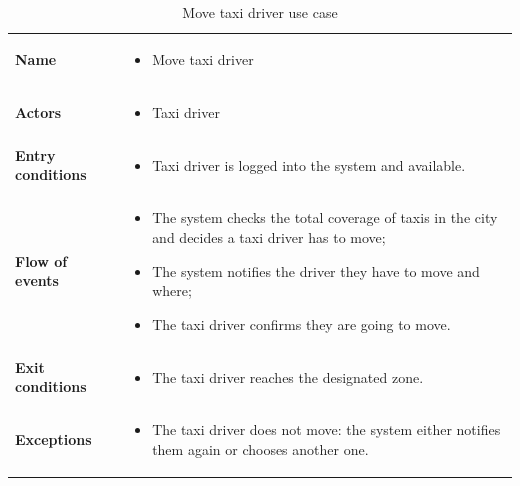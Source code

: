 \begin{table}
\begin{center}
\begin{tabular}{lp{}}
\toprule
\textbf{Name}		&	\begin{itemize}
					\item Move taxi driver
					\end{itemize}	\\
\textbf{Actors}		&	\begin{itemize}
					\item Taxi driver
					\end{itemize}	\\
\textbf{Entry conditions}	&	\begin{itemize}
					\item Taxi driver is logged into the system and available.
					\end{itemize}	\\
\textbf{Flow of events}	&	\begin{itemize}
					\item The system checks the total coverage of taxis in the city and decides a taxi driver has to move;
					\item The system notifies the driver they have to move and where;
					\item The taxi driver confirms they are going to move.
					\end{itemize}	\\
\textbf{Exit conditions}	&	\begin{itemize}
					\item	The taxi driver reaches the designated zone.
					\end{itemize}	\\
\textbf{Exceptions}	&	\begin{itemize}
					\item The taxi driver does not move: the system either notifies them again or chooses another one.
					\end{itemize}	\\
\bottomrule
\end{tabular}
\caption{Move taxi driver use case}
\end{center}
\end{table}
\clearpage

